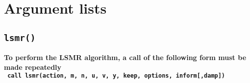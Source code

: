 \newpage
\section{Argument lists}

\subsection{\texttt{lsmr()}}
\textbf{%
   To perform the LSMR algorithm, a call of the following form must be made repeatedly\\
   \vspace{0.2cm}
   \texttt{ \hspace*{0.2cm}
      call lsmr(action, m, n, u, v, y, keep, options, inform[,damp])
   }
}

